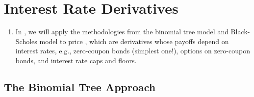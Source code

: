 \section{Interest Rate Derivatives}
\label{sect:ir-deriv}
\begin{enumerate}
\item In , we will apply the methodologies from the
binomial tree model and Black-Scholes model to price , which are derivatives whose payoffs depend on interest rates,
e.g., zero-coupon bonds (simplest one!), options on zero-coupon bonds, and
interest rate caps and floors.
\end{enumerate}
\subsection{The Binomial Tree Approach}
\label{subsect:ir-deriv-binomial-tree}
